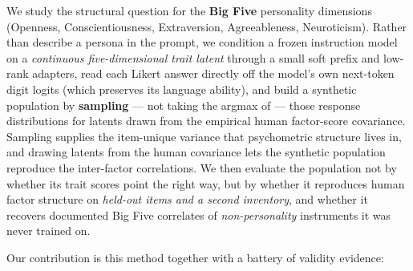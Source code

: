 \documentclass[11pt]{article}
\begin{document}
We study the structural question for the \textbf{Big Five} personality dimensions (Openness, Conscientiousness, Extraversion, Agreeableness, Neuroticism). Rather than describe a persona in the prompt, we condition a frozen instruction model on a \textit{continuous five-dimensional trait latent} through a small soft prefix and low-rank adapters, read each Likert answer directly off the model's own next-token digit logits (which preserves its language ability), and build a synthetic population by \textbf{sampling} — not taking the argmax of — those response distributions for latents drawn from the empirical human factor-score covariance. Sampling supplies the item-unique variance that psychometric structure lives in, and drawing latents from the human covariance lets the synthetic population reproduce the inter-factor correlations. We then evaluate the population not by whether its trait scores point the right way, but by whether it reproduces human factor structure on \textit{held-out items and a second inventory}, and whether it recovers documented Big Five correlates of \textit{non-personality} instruments it was never trained on.

Our contribution is this method together with a battery of validity evidence:
\end{document}
